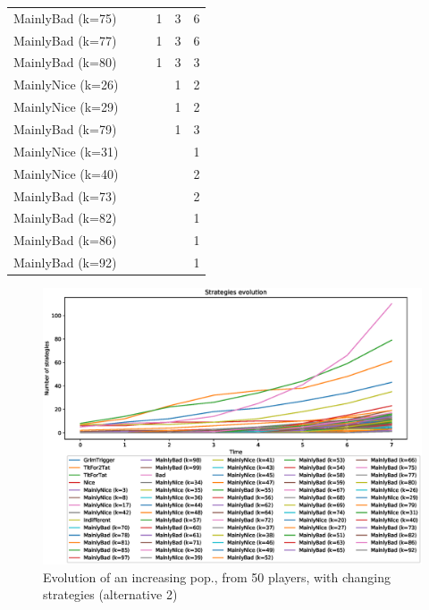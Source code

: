 \documentclass[journal,10pt,twoside]{IEEEtran}
\begin{document}
\begin{table}[ht]
\begin{minipage}{.35\textwidth}
\begin{tabular}{l|ccccc}
        MainlyBad (k=75)    &      &      &    1 &    3 &    6 \\
        MainlyBad (k=77)    &      &      &    1 &    3 &    6 \\
        MainlyBad (k=80)    &      &      &    1 &    3 &    3 \\
        MainlyNice (k=26)   &      &      &      &    1 &    2 \\
        MainlyNice (k=29)   &      &      &      &    1 &    2 \\
        MainlyBad (k=79)    &      &      &      &    1 &    3 \\
        MainlyNice (k=31)   &      &      &      &      &    1 \\
        MainlyNice (k=40)   &      &      &      &      &    2 \\
        MainlyBad (k=73)    &      &      &      &      &    2 \\
        MainlyBad (k=82)    &      &      &      &      &    1 \\
        MainlyBad (k=86)    &      &      &      &      &    1 \\
        MainlyBad (k=92)    &      &      &      &      &    1 \\ \bottomrule
    \end{tabular}
    \end{minipage}
\end{table}

\begin{figure}[!ht]
    \centering
    \includegraphics[width=.7\columnwidth]{../img/cipdmp-incr/alt2/cipdmp-evolution-increasing-pop-50}
    \caption{Evolution of an increasing pop., from 50 players, with changing strategies (alternative 2)}
    \label{fig:incrC2}
\end{figure}

\end{document}
